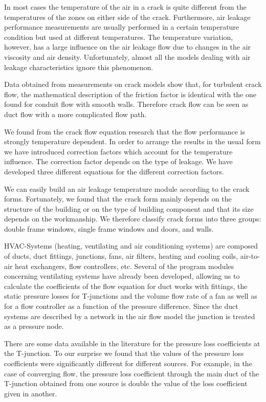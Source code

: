 \documentclass[10pt]{article}
\begin{document}
In most cases the temperature of the air in a crack is quite different from the temperatures of the zones on either side of the crack. Furthermore, air leakage performance measurements are usually performed in a certain temperature condition but used at different temperatures. The temperature variation, however, has a large influence on the air leakage flow due to changes in the air viscosity and air density. Unfortunately, almost all the models dealing with air leakage characteristics ignore this phenomenon.

Data obtained from measurements on crack models show that, for turbulent crack flow, the mathematical description of the friction factor is identical with the one found for conduit flow with smooth walls. Therefore crack flow can be seen as duct flow with a more complicated flow path.

We found from the crack flow equation research that the flow performance is strongly temperature dependent. In order to arrange the results in the usual form we have introduced correction factors which account for the temperature influence. The correction factor depends on the type of leakage. We have developed three different equations for the different correction factors.

We can easily build an air leakage temperature module according to the crack forms. Fortunately, we found that the crack form mainly depends on the structure of the building or on the type of building component and that its size depends on the workmanship. We therefore classify crack forms into three groups: double frame windows, single frame windows and doors, and walls. 

HVAC-Systems (heating, ventilating and air conditioning systems) are composed of ducts, duct fittings, junctions, fans, air filters, heating and cooling coils, air-to-air heat exchangers, flow controllers, etc. Several of the program modules concerning ventilating systems have already been developed, allowing us to calculate the coefficients of the flow equation for duct works with fittings, the static pressure losses for T-junctions and the volume flow rate of a fan as well as for a flow controller as a function of the pressure difference. Since the duct systems are described by a network in the air flow model the junction is treated as a pressure node.

There are some data available in the literature for the pressure loss coefficients at the T-junction. To our surprise we found that the values of the pressure loss coefficients were significantly different for different sources. For example, in the case of converging flow, the pressure loss coefficient through the main duct of the T-junction obtained from one source is double the value of the loss coefficient given in another.
\end{document}
